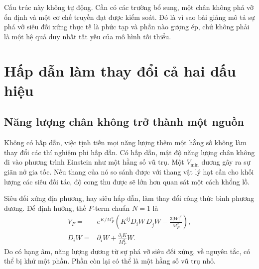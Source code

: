 Cấu trúc này không tự động. Cần có các trường bổ sung, một chân không phá vỡ ổn định và một cơ chế truyền đạt được kiểm soát. Đó là vì sao bài giảng mô tả sự phá vỡ siêu đối xứng thực tế là phức tạp và phần nào gượng ép, chứ không phải là một hệ quả duy nhất tất yếu của mô hình tối thiểu.

\section{Hấp dẫn làm thay đổi cả hai dấu hiệu}

\subsection{Năng lượng chân không trở thành một nguồn}

Không có hấp dẫn, việc tịnh tiến mọi năng lượng thêm một hằng số không làm thay đổi các thí nghiệm phi hấp dẫn. Có hấp dẫn, mật độ năng lượng chân không đi vào phương trình Einstein như một hằng số vũ trụ. Một \(V_{\min}\) dương gây ra sự giãn nở gia tốc. Nếu thang của nó so sánh được với thang vật lý hạt cần cho khối lượng các siêu đối tác, độ cong thu được sẽ lớn hơn quan sát một cách khổng lồ.

\begin{classroomqa}
\end{classroomqa}

Siêu đối xứng địa phương, hay siêu hấp dẫn, làm thay đổi công thức bình phương dương. Để định hướng, thế \(F\)-term chuẩn \(N=1\) là
\begin{equation}
\begin{aligned}
V_F={}&e^{K/M_P^2}
\left(
K^{i\bar j}D_iW\,D_{\bar j}\overline W
-\frac{3|W|^2}{M_P^2}
\right),\\
D_iW={}&\partial_iW+\frac{\partial_iK}{M_P^2}W.
\end{aligned}
\label{eq:l9-sugra-potential}
\end{equation}
Do có hạng âm, năng lượng dương từ sự phá vỡ siêu đối xứng, về nguyên tắc, có thể bị khử một phần. Phần còn lại có thể là một hằng số vũ trụ nhỏ.



